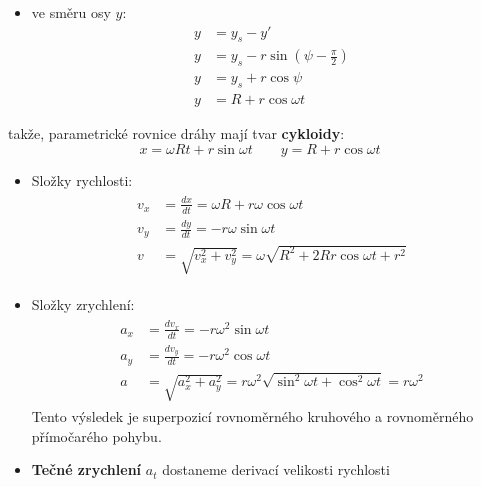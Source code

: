 \begin{mdframed}[style=mdexam]
\begin{example}
    \begin{itemize}
        \item ve směru osy \(y\): 
        \begin{align*}
          y &= y_s - y'                        \\
          y &= y_s - r\sin(\psi-\frac{\pi}{2}) \\
          y &= y_s + r\cos\psi                 \\
          y &= R + r\cos\omega t
        \end{align*}
      \end{itemize}

    takže, parametrické rovnice dráhy mají tvar \textbf{cykloidy}:
    \begin{equation*}
      x = \omega R t + r\sin\omega t  \qquad y = R + r\cos\omega t
    \end{equation*}
    \begin{itemize}
      \item Složky rychlosti:
        \begin{gather*}
          \begin{align*} 
          v_x &= \frac{dx}{dt} = \omega R + r\omega\cos\omega t                       \\
          v_y &= \frac{dy}{dt} = -r\omega\sin\omega t                                 \\
          v   &= \sqrt{v_x^2 + v_y^2}= \omega\sqrt{R^2 + 2Rr\cos\omega t + r^2}
          \end{align*}
        \end{gather*}
      \item Složky zrychlení:
        \begin{gather*}
          \begin{align*}
            a_x &= \frac{dv_x}{dt} = -r\omega^2\sin\omega t                           \\
            a_y &= \frac{dv_y}{dt} = -r\omega^2\cos\omega t                           \\
            a   &= \sqrt{a_x^2 + a_y^2}= r\omega^2\sqrt{\sin^2\omega t + 
                  \cos^2\omega t} = r\omega^2
          \end{align*}
        \end{gather*}
        Tento výsledek je superpozicí rovnoměrného kruhového a rovnoměrného přímočarého pohybu.
      \item \textbf{Tečné zrychlení} \(a_t\) dostaneme derivací velikosti rychlosti
        \begin{equation*}

\end{equation*}
\end{itemize}
\end{example}
\end{mdframed}

